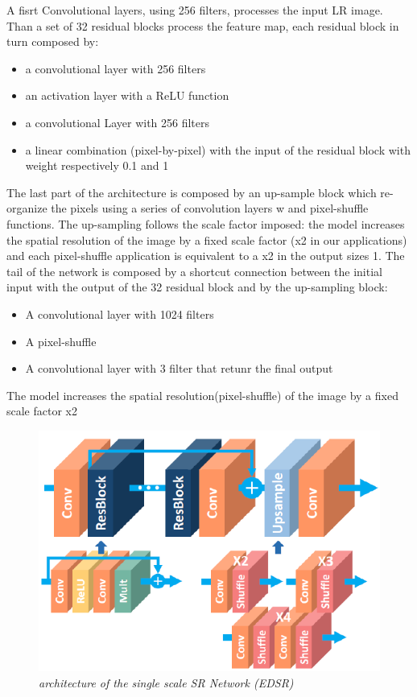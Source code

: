 \documentclass[a4paper, 10pt]{book}
\begin{document}
A fisrt Convolutional layers, using 256 filters, processes the input LR image. Than a set of 32 residual blocks process the feature map, each residual block in turn composed by:
\begin{itemize}
 \setlength\itemsep{-0.3em}
 \item a convolutional layer with 256 filters
 \item an activation layer with a ReLU function
 \item a convolutional Layer with 256 filters
 \item a linear combination (pixel-by-pixel) with the input of the residual block with weight respectively 0.1 and 1
\end{itemize}

 The last part of the architecture is composed by an up-sample block which re-organize the pixels using a series of convolution layers w and pixel-shuffle functions. The up-sampling follows the scale factor imposed: the model increases the spatial resolution of the image by a fixed scale factor (x2  in our applications) and each pixel-shuffle application is equivalent to a x2 in the output sizes 1.
 The tail of the network is composed by a shortcut connection between the initial input with the output of the 32 residual block and by the up-sampling block:
 
\begin{itemize}
 \setlength\itemsep{-0.2em}
 \item A convolutional layer with 1024 filters 
 \item A pixel-shuffle
 \item A convolutional layer with 3 filter that retunr the final output
\end{itemize}
The model increases the spatial resolution(pixel-shuffle) of the image by a fixed scale factor x2 

\begin{figure}[H]
 \centering
 \includegraphics[scale=0.4]{edsr_structure.png}
 \caption{\it architecture of the single scale SR Network (EDSR)}
 \label{fig:edsr-structure}
\end{figure}
\end{document}
